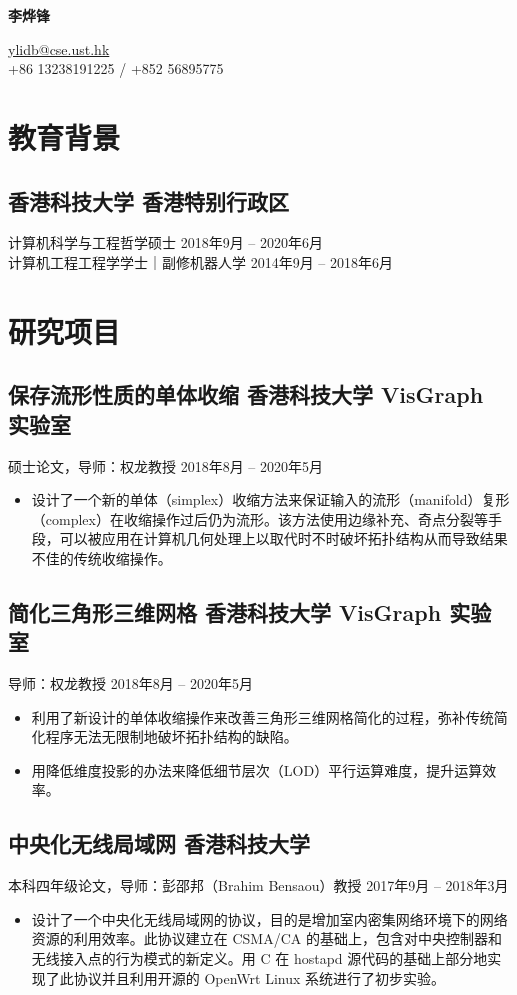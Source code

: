 \documentclass[
  10pt,           %
  autoindent=0pt, %
  scheme=plain,   %
]{ctexart}
\newcommand{\subsec}[2]{\subsection*{#1 \hfill {\normalfont #2}}}
\newcommand{\subsecdesc}[2]{{\kaishu #1 \hfill #2}}
\begin{document}
\begin{center}
{\LARGE\bfseries 李烨锋}
\vspace{4pt}

{\small\ttfamily
  \href{mailto:ylidb@cse.ust.hk}{ylidb@cse.ust.hk} \\
  +86 13238191225 / +852 56895775
}
\end{center}

\section*{教育背景} %

  \subsec{香港科技大学}{香港特别行政区}
  \subsecdesc{计算机科学与工程哲学硕士}{2018年9月 -- 2020年6月} \\
  \subsecdesc{计算机工程工程学学士｜副修机器人学}{2014年9月 -- 2018年6月}

\section*{研究项目} %

  \subsec{保存流形性质的单体收缩}{香港科技大学 VisGraph 实验室}
  \subsecdesc{硕士论文，导师：权龙教授}{2018年8月 -- 2020年5月}
  \begin{itemize}
    \item 设计了一个新的单体（simplex）收缩方法来保证输入的流形（manifold）复形（complex）在收缩操作过后仍为流形。该方法使用边缘补充、奇点分裂等手段，可以被应用在计算机几何处理上以取代时不时破坏拓扑结构从而导致结果不佳的传统收缩操作。
  \end{itemize}

  \subsec{简化三角形三维网格}{香港科技大学 VisGraph 实验室}
  \subsecdesc{导师：权龙教授}{2018年8月 -- 2020年5月}
  \begin{itemize}
    \item 利用了新设计的单体收缩操作来改善三角形三维网格简化的过程，弥补传统简化程序无法无限制地破坏拓扑结构的缺陷。
    \item 用降低维度投影的办法来降低细节层次（LOD）平行运算难度，提升运算效率。
  \end{itemize}

  \subsec{中央化无线局域网}{香港科技大学}
  \subsecdesc{本科四年级论文，导师：彭邵邦（Brahim Bensaou）教授}{2017年9月 -- 2018年3月}
  \begin{itemize}
    \item 设计了一个中央化无线局域网的协议，目的是增加室内密集网络环境下的网络资源的利用效率。此协议建立在 CSMA/CA 的基础上，包含对中央控制器和无线接入点的行为模式的新定义。用 C 在 hostapd 源代码的基础上部分地实现了此协议并且利用开源的 OpenWrt Linux 系统进行了初步实验。
  \end{itemize}
\end{document}
